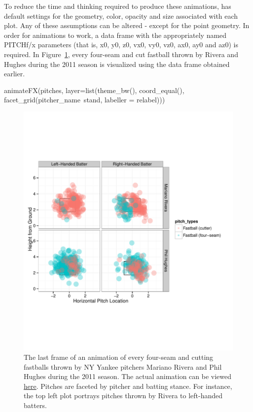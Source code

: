 \begin{article}
To reduce the time and thinking required to produce these animations,
 has default settings for the geometry, color, opacity
and size associated with each plot. Any of these assumptions can be
altered - except for the point geometry. In order for animations to
work, a data frame with the appropriately named PITCHf/x parameters
(that is, x0, y0, z0, vx0, vy0, vz0, ax0, ay0 and az0) is required.
In Figure~\ref{fig:animate1}, every four-seam and cut fastball thrown
by Rivera and Hughes during the 2011 season is visualized using the
 data frame obtained earlier.
%
\begin{Schunk}
\begin{Sinput}
animateFX(pitches, layer=list(theme_bw(), coord_equal(),
  facet_grid(pitcher_name~stand, labeller = relabel)))
\end{Sinput}
\end{Schunk}
%
\begin{figure}[h]
\centerline{\includegraphics[scale = 1]{ani1-frame.pdf}}

\caption{\label{fig:animate1}The last frame of an animation of every four-seam
and cutting fastballs thrown by NY Yankee pitchers Mariano Rivera
and Phil Hughes during the 2011 season. The actual animation can be
viewed \protect\href{http://cpsievert.github.io/pitchRx/ani1}{here}.
Pitches are faceted by pitcher and batting stance. For instance, the
top left plot portrays pitches thrown by Rivera to left-handed batters.}
\end{figure}



\end{article}
